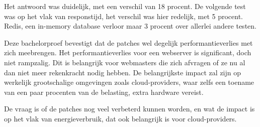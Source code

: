 Het antwoord was duidelijk, met een verschil van 18 procent.
De volgende test was op het vlak van responstijd, het verschil was hier redelijk, met 5 procent.
Redis, een in-memory database verloor maar 3 procent over allerlei andere testen.

Deze bachelorproef bevestigt dat de patches wel degelijk performantieverlies met zich meebrengen. 
Het performantieverlies voor een webserver is significant, doch niet rampzalig.
Dit is belangrijk voor webmasters die zich afvragen of ze nu al dan niet meer rekenkracht nodig hebben. De belangrijkste impact zal zijn op werkelijk grootschalige omgevingen zoals cloud-providers, waar zelfs een toename van een paar procenten van de belasting, extra hardware vereist.

De vraag is of de patches nog veel verbeterd kunnen worden, en wat de impact is op het vlak van energieverbruik, dat ook belangrijk is voor cloud-providers.






